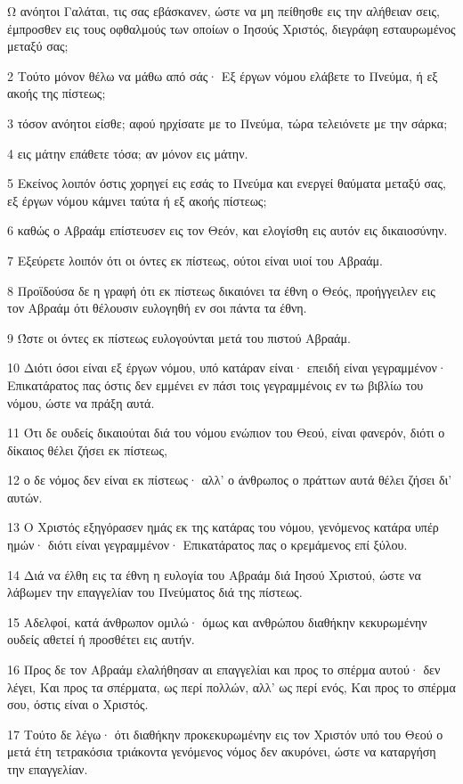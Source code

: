 \par Ω ανόητοι Γαλάται, τις σας εβάσκανεν, ώστε να μη πείθησθε εις την αλήθειαν σεις, έμπροσθεν εις τους οφθαλμούς των οποίων ο Ιησούς Χριστός, διεγράφη εσταυρωμένος μεταξύ σας;
\par 2 Τούτο μόνον θέλω να μάθω από σάς· Εξ έργων νόμου ελάβετε το Πνεύμα, ή εξ ακοής της πίστεως;
\par 3 τόσον ανόητοι είσθε; αφού ηρχίσατε με το Πνεύμα, τώρα τελειόνετε με την σάρκα;
\par 4 εις μάτην επάθετε τόσα; αν μόνον εις μάτην.
\par 5 Εκείνος λοιπόν όστις χορηγεί εις εσάς το Πνεύμα και ενεργεί θαύματα μεταξύ σας, εξ έργων νόμου κάμνει ταύτα ή εξ ακοής πίστεως;
\par 6 καθώς ο Αβραάμ επίστευσεν εις τον Θεόν, και ελογίσθη εις αυτόν εις δικαιοσύνην.
\par 7 Εξεύρετε λοιπόν ότι οι όντες εκ πίστεως, ούτοι είναι υιοί του Αβραάμ.
\par 8 Προϊδούσα δε η γραφή ότι εκ πίστεως δικαιόνει τα έθνη ο Θεός, προήγγειλεν εις τον Αβραάμ ότι θέλουσιν ευλογηθή εν σοι πάντα τα έθνη.
\par 9 Ώστε οι όντες εκ πίστεως ευλογούνται μετά του πιστού Αβραάμ.
\par 10 Διότι όσοι είναι εξ έργων νόμου, υπό κατάραν είναι· επειδή είναι γεγραμμένον· Επικατάρατος πας όστις δεν εμμένει εν πάσι τοις γεγραμμένοις εν τω βιβλίω του νόμου, ώστε να πράξη αυτά.
\par 11 Ότι δε ουδείς δικαιούται διά του νόμου ενώπιον του Θεού, είναι φανερόν, διότι ο δίκαιος θέλει ζήσει εκ πίστεως,
\par 12 ο δε νόμος δεν είναι εκ πίστεως· αλλ' ο άνθρωπος ο πράττων αυτά θέλει ζήσει δι' αυτών.
\par 13 Ο Χριστός εξηγόρασεν ημάς εκ της κατάρας του νόμου, γενόμενος κατάρα υπέρ ημών· διότι είναι γεγραμμένον· Επικατάρατος πας ο κρεμάμενος επί ξύλου.
\par 14 Διά να έλθη εις τα έθνη η ευλογία του Αβραάμ διά Ιησού Χριστού, ώστε να λάβωμεν την επαγγελίαν του Πνεύματος διά της πίστεως.
\par 15 Αδελφοί, κατά άνθρωπον ομιλώ· όμως και ανθρώπου διαθήκην κεκυρωμένην ουδείς αθετεί ή προσθέτει εις αυτήν.
\par 16 Προς δε τον Αβραάμ ελαλήθησαν αι επαγγελίαι και προς το σπέρμα αυτού· δεν λέγει, Και προς τα σπέρματα, ως περί πολλών, αλλ' ως περί ενός, Και προς το σπέρμα σου, όστις είναι ο Χριστός.
\par 17 Τούτο δε λέγω· ότι διαθήκην προκεκυρωμένην εις τον Χριστόν υπό του Θεού ο μετά έτη τετρακόσια τριάκοντα γενόμενος νόμος δεν ακυρόνει, ώστε να καταργήση την επαγγελίαν.
